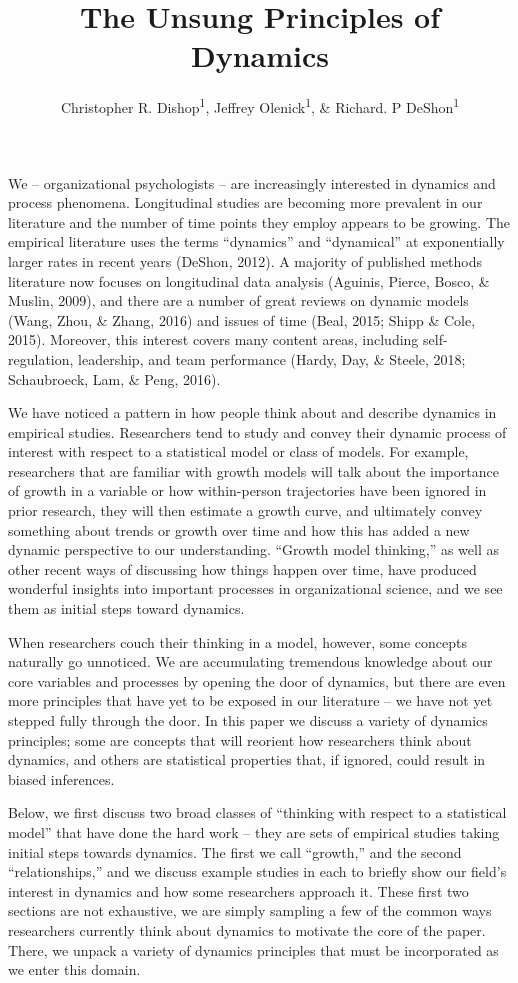 \documentclass[english,,man]{apa6}
\title{The Unsung Principles of Dynamics}
\author{Christopher R. Dishop\textsuperscript{1}, Jeffrey
Olenick\textsuperscript{1}, \& Richard. P DeShon\textsuperscript{1}}
\date{}
\affiliation{
\vspace{0.5cm}
\textsuperscript{1} Michigan State University}
\theoremstyle{definition}
\theoremstyle{definition}
\theoremstyle{definition}
\theoremstyle{remark}
\begin{document}
\maketitle

We -- organizational psychologists -- are increasingly interested in
dynamics and process phenomena. Longitudinal studies are becoming more
prevalent in our literature and the number of time points they employ
appears to be growing. The empirical literature uses the terms
\enquote{dynamics} and \enquote{dynamical} at exponentially larger rates
in recent years (DeShon, 2012). A majority of published methods
literature now focuses on longitudinal data analysis (Aguinis, Pierce,
Bosco, \& Muslin, 2009), and there are a number of great reviews on
dynamic models (Wang, Zhou, \& Zhang, 2016) and issues of time (Beal,
2015; Shipp \& Cole, 2015). Moreover, this interest covers many content
areas, including self-regulation, leadership, and team performance
(Hardy, Day, \& Steele, 2018; Schaubroeck, Lam, \& Peng, 2016).

We have noticed a pattern in how people think about and describe
dynamics in empirical studies. Researchers tend to study and convey
their dynamic process of interest with respect to a statistical model or
class of models. For example, researchers that are familiar with growth
models will talk about the importance of growth in a variable or how
within-person trajectories have been ignored in prior research, they
will then estimate a growth curve, and ultimately convey something about
trends or growth over time and how this has added a new dynamic
perspective to our understanding. \enquote{Growth model thinking,} as
well as other recent ways of discussing how things happen over time,
have produced wonderful insights into important processes in
organizational science, and we see them as initial steps toward
dynamics.

When researchers couch their thinking in a model, however, some concepts
naturally go unnoticed. We are accumulating tremendous knowledge about
our core variables and processes by opening the door of dynamics, but
there are even more principles that have yet to be exposed in our
literature -- we have not yet stepped fully through the door. In this
paper we discuss a variety of dynamics principles; some are concepts
that will reorient how researchers think about dynamics, and others are
statistical properties that, if ignored, could result in biased
inferences.

Below, we first discuss two broad classes of \enquote{thinking with
respect to a statistical model} that have done the hard work -- they are
sets of empirical studies taking initial steps towards dynamics. The
first we call \enquote{growth,} and the second \enquote{relationships,}
and we discuss example studies in each to briefly show our field's
interest in dynamics and how some researchers approach it. These first
two sections are not exhaustive, we are simply sampling a few of the
common ways researchers currently think about dynamics to motivate the
core of the paper. There, we unpack a variety of dynamics principles
that must be incorporated as we enter this domain.
\end{document}
